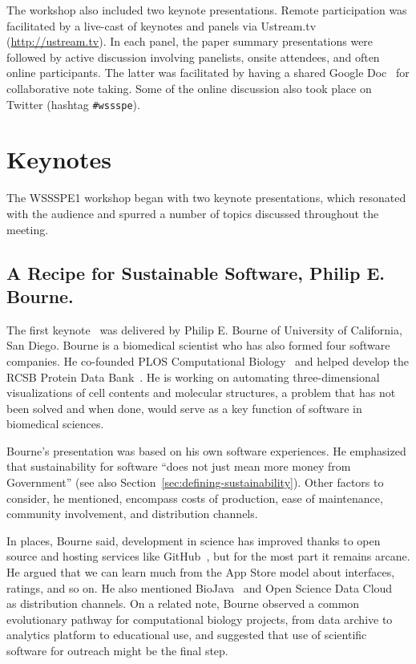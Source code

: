 \documentclass[11pt, oneside]{amsart}
\newcommand{\note}[1]{ {\textcolor{red}    { #1 }}}
\begin{document}
The workshop also included two keynote presentations.
Remote participation was facilitated by a
live-cast of keynotes and panels via Ustream.tv
(\url{http://ustream.tv}).
In each panel, the paper summary presentations were followed by active discussion
involving panelists, onsite attendees, and often online
participants. The latter was facilitated by having a shared Google
Doc~\cite{WSSSPE1-google-notes} for collaborative note taking. Some of
the online discussion also took place on Twitter (hashtag
\texttt{\#wssspe}).



\section{Keynotes } \label{sec:keynotes} %

The WSSSPE1 workshop began with two keynote presentations, which 
resonated with the audience and spurred a number of topics  
discussed throughout the meeting.

\subsection{A Recipe for Sustainable Software, Philip E. Bourne.} \label{sec:keynote1}

The first keynote~\cite{WSSSPE1-keynote1} was delivered by Philip
E. Bourne of University of California, San Diego.  Bourne is a
biomedical scientist who has also formed four software companies. He
co-founded PLOS Computational Biology~\cite{plos-web} and helped
develop the RCSB Protein Data Bank~\cite{pdb-web}.  He is working on
automating three-dimensional visualizations of cell contents and
molecular structures, a problem that has not been solved and when
done, would serve as a key function of software in biomedical
sciences.

Bourne's presentation was based on his own software experiences.  He
emphasized that sustainability for software ``does not just mean more
money from Government'' (see also
Section~\ref{sec:defining-sustainability}).  Other factors to
consider, he mentioned, encompass costs of production, ease of
maintenance, community involvement, and distribution channels.

In places, Bourne said, development in science has improved thanks to
open source and hosting services like GitHub~\cite{github-web}, but
for the most part it remains arcane. He argued that we can learn much
from the App Store model about interfaces, ratings, and so on. He also
mentioned BioJava~\cite{biojava-web} and Open Science Data
Cloud~\cite{osdc-web} as distribution channels.  On a related note,
Bourne observed a common evolutionary pathway for computational
biology projects, from data archive to analytics platform to
educational use, and suggested that use of scientific software for
outreach might be the final step.
\end{document}
